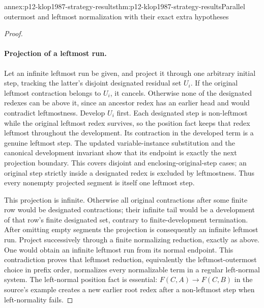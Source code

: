 \begin{annexitem}{annex:p12-klop1987-strategy-results}{thm:p12-klop1987-strategy-results}{Parallel outermost and leftmost normalization with their exact extra hypotheses}
\begin{proof}
\paragraph{Projection of a leftmost run.}
Let an infinite leftmost run be given, and project it through one
arbitrary initial step, tracking the latter's disjoint designated
residual set \(U_i\). If the original leftmost contraction belongs
to \(U_i\), it cancels. Otherwise none of the designated redexes
can be above it, since an ancestor redex has an earlier head and would
contradict leftmostness. Develop \(U_i\) first. Each designated
step is non-leftmost while the original leftmost redex survives, so
the position fact keeps that redex leftmost throughout the development.
Its contraction in the developed term is a genuine leftmost step.
The updated variable-instance substitution and the canonical
development invariant show that its endpoint is exactly the next
projection boundary. This covers disjoint and enclosing-original-step
cases; an original step strictly inside a designated redex is excluded
by leftmostness. Thus every nonempty projected segment is itself one
leftmost step.

This projection is infinite. Otherwise all original contractions after
some finite row would be designated contractions; their infinite tail
would be a development of that row's finite designated set, contrary
to finite-development termination. After omitting empty segments the
projection is consequently an infinite leftmost run. Project successively
through a finite normalizing reduction, exactly as above. One would
obtain an infinite leftmost run from its normal endpoint. This
contradiction proves that leftmost reduction, equivalently the
leftmost-outermost choice in prefix order, normalizes every normalizable
term in a regular left-normal system. The left-normal position fact
is essential: \(F(C,A)\to F(C,B)\) in the source's example creates
a new earlier root redex after a non-leftmost step when left-normality
fails.


\end{proof}
\end{annexitem}
